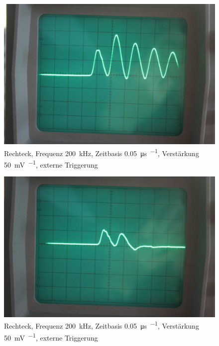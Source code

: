 \begin{figure}
	\centering
	\begin{minipage}{.45\linewidth}
	\end{minipage}
	\hfill
	\begin{minipage}{.45\linewidth}
	\includegraphics[width=\linewidth]{Fotos/IMG_0764-1500.jpg}
	\end{minipage}
	\caption{%
		Rechteck, Frequenz \SI{200}{\kilo\hertz},
		Zeitbasis \SI{.05}{\micro\second\per\division},
		Verstärkung \SI{50}{\milli\volt\per\division},
		externe Triggerung
	}
	\label{fig:0764}
\end{figure}

\begin{figure}
	\centering
	\begin{minipage}{.45\linewidth}
	\end{minipage}
	\hfill
	\begin{minipage}{.45\linewidth}
	\includegraphics[width=\linewidth]{Fotos/IMG_0766-1500.jpg}
	\end{minipage}
	\caption{%
		Rechteck, Frequenz \SI{200}{\kilo\hertz},
		Zeitbasis \SI{.05}{\micro\second\per\division},
		Verstärkung \SI{50}{\milli\volt\per\division},
		externe Triggerung
	}
	\label{fig:0766}
\end{figure}

